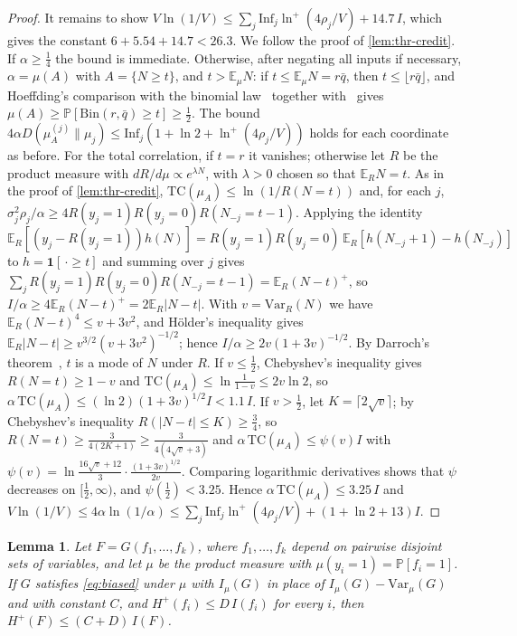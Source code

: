 \documentclass[11pt]{amsart}
\newtheorem{lemma}[theorem]{Lemma}
\theoremstyle{definition}
\theoremstyle{remark}
\newcommand{\E}{\mathbb{E}}
\renewcommand{\Pr}{\mathbb{P}}
\newcommand{\Inf}{\mathrm{Inf}}
\newcommand{\Var}{\mathrm{Var}}
\newcommand{\Bin}{\mathrm{Bin}}
\begin{document}
\begin{proof}
It remains to show $V\ln(1/V)\le\sum_j\Inf_j\ln^+(4\rho_j/V)+14.7\,I$, which gives the constant $6+5.54+14.7<26.3$. We
follow the proof of \cref{lem:thr-credit}. If $\alpha\ge\frac14$ the bound is immediate. Otherwise, after negating all
inputs if necessary, $\alpha=\mu(A)$ with $A=\{N\ge t\}$, and $t>\E_\mu N$: if $t\le\E_\mu N=r\bar q$, then
$t\le\lfloor r\bar q\rfloor$, and Hoeffding's comparison with the binomial law~\cite[Theorem~4]{Hoe56} together
with~\cite{KB80} gives $\mu(A)\ge\Pr[\Bin(r,\bar q)\ge t]\ge\frac12$. The bound
$4\alpha D(\mu_A^{(j)}\|\mu_j)\le\Inf_j(1+\ln2+\ln^+(4\rho_j/V))$ holds for each coordinate as before. For the total
correlation, if $t=r$ it vanishes; otherwise let $R$ be the product measure with $dR/d\mu\propto e^{\lambda N}$, with
$\lambda>0$ chosen so that $\E_RN=t$. As in the proof of \cref{lem:thr-credit}, $\mathrm{TC}(\mu_A)\le\ln(1/R(N=t))$
and, for each $j$, $\sigma_j^2\rho_j/\alpha\ge4R(y_j{=}1)R(y_j{=}0)R(N_{-j}=t-1)$. Applying the identity
$\E_R[(y_j-R(y_j{=}1))h(N)]=R(y_j{=}1)R(y_j{=}0)\,\E_R[h(N_{-j}+1)-h(N_{-j})]$ to $h=\mathbf 1[\,\cdot\ge t]$ and summing over
$j$ gives $\sum_jR(y_j{=}1)R(y_j{=}0)R(N_{-j}=t-1)=\E_R(N-t)^+$, so $I/\alpha\ge4\E_R(N-t)^+=2\E_R|N-t|$. With
$v=\Var_R(N)$ we have $\E_R(N-t)^4\le v+3v^2$, and H\"older's inequality gives
$\E_R|N-t|\ge v^{3/2}(v+3v^2)^{-1/2}$; hence $I/\alpha\ge2v(1+3v)^{-1/2}$. By Darroch's theorem~\cite{Dar64}, $t$ is a mode
of $N$ under $R$. If $v\le\frac12$, Chebyshev's inequality gives $R(N=t)\ge1-v$ and $\mathrm{TC}(\mu_A)\le\ln\frac1{1-v}\le
2v\ln2$, so $\alpha\,\mathrm{TC}(\mu_A)\le(\ln2)(1+3v)^{1/2}I<1.1\,I$. If $v>\frac12$, let $K=\lceil2\sqrt v\rceil$; by
Chebyshev's inequality $R(|N-t|\le K)\ge\frac34$, so $R(N=t)\ge\frac3{4(2K+1)}\ge\frac3{4(4\sqrt v+3)}$ and
$\alpha\,\mathrm{TC}(\mu_A)\le\psi(v)I$ with $\psi(v)=\ln\frac{16\sqrt v+12}3\cdot\frac{(1+3v)^{1/2}}{2v}$. Comparing
logarithmic derivatives shows that $\psi$ decreases on $[\frac12,\infty)$, and $\psi(\frac12)<3.25$. Hence
$\alpha\,\mathrm{TC}(\mu_A)\le3.25\,I$ and $V\ln(1/V)\le4\alpha\ln(1/\alpha)\le\sum_j\Inf_j\ln^+(4\rho_j/V)+(1+\ln2+13)I$.
\end{proof}

\begin{lemma}\label{lem:weak-compose}
Let $F=G(f_1,\dots,f_k)$, where $f_1,\dots,f_k$ depend on pairwise disjoint sets of variables, and let $\mu$ be the
product measure with $\mu(y_i=1)=\Pr[f_i=1]$. If $G$ satisfies \eqref{eq:biased} under $\mu$ with $I_\mu(G)$ in place
of $I_\mu(G)-\Var_\mu(G)$ and with constant $C$, and $H^+(f_i)\le D\,I(f_i)$ for every $i$, then
$H^+(F)\le(C+D)\,I(F)$.
\end{lemma}
\end{document}
